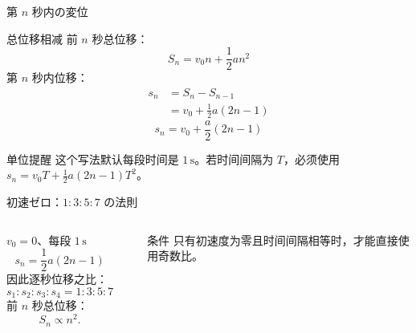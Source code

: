 \documentclass[notheorems,aspectratio=169]{beamer}
\newcommand{\unit}[1]{\,\mathrm{#1}}
\begin{document}
\begin{frame}{第 $n$ 秒内の変位}
  \small
  \begin{block}{总位移相减}
    前 $n$ 秒总位移：
    \[
      S_n=v_0n+\frac12an^2
    \]
    第 $n$ 秒内位移：
    \begin{align*}
      s_n&=S_n-S_{n-1}\\
      &=v_0+\frac12a(2n-1)
    \end{align*}
    \[
      \boxed{s_n=v_0+\frac{a}{2}(2n-1)}
    \]
  \end{block}
  \begin{alertblock}{单位提醒}
    这个写法默认每段时间是 $1\unit{s}$。若时间间隔为 $T$，必须使用
    $s_n=v_0T+\frac12a(2n-1)T^2$。
  \end{alertblock}
\end{frame}

\begin{frame}{初速ゼロ：$1:3:5:7$ の法則}
  \begin{columns}[T,onlytextwidth]
    \begin{block}{$v_0=0$、每段 $1\unit{s}$}
      \[
        s_n=\frac12a(2n-1)
      \]
      因此逐秒位移之比：
      \[
        \boxed{s_1:s_2:s_3:s_4=1:3:5:7}
      \]
      前 $n$ 秒总位移：
      \[
        S_n\propto n^2.
      \]
    \end{block}
    \begin{center}
    \end{center}
    \begin{alertblock}{条件}
      只有初速度为零且时间间隔相等时，才能直接使用奇数比。
    \end{alertblock}
  \end{columns}
\end{frame}
\end{document}
